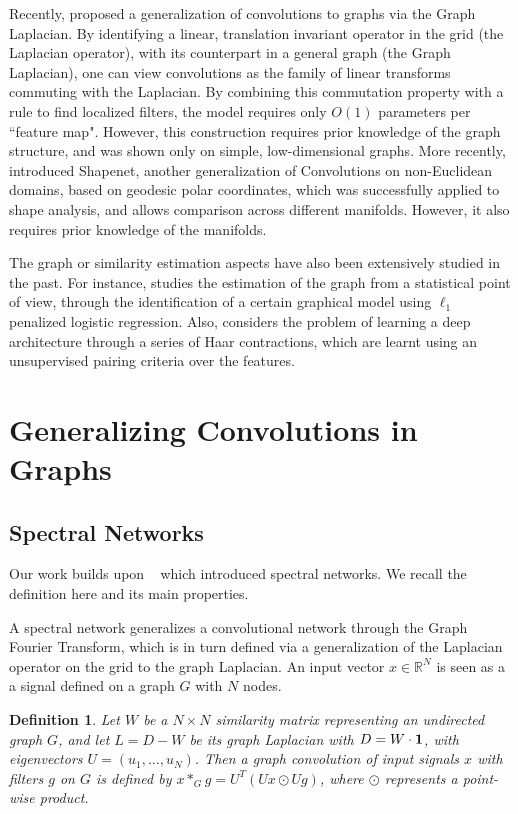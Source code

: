 \documentclass{article} %
\newtheorem{graphconv}{Definition}
\begin{document}
Recently, \cite{spectralnet2013} proposed a generalization of convolutions to graphs via the Graph Laplacian. By identifying a linear, translation invariant operator in the grid (the Laplacian operator), with its counterpart in a general graph (the Graph Laplacian), one can view convolutions as the family of linear transforms commuting with the Laplacian. By combining this commutation property with a rule to find localized filters, the model requires only $O(1)$ parameters per ``feature map". However, this construction requires prior knowledge of the graph structure, and was shown only on simple, low-dimensional graphs. More recently, \cite{DBLP:journals/corr/MasciBBV15} introduced Shapenet, another generalization of Convolutions on non-Euclidean domains, based on geodesic polar coordinates, which was successfully applied to shape analysis, and allows comparison across different manifolds. However, it also requires prior knowledge of the manifolds. 

The graph or similarity estimation aspects have also been extensively studied in the past. For instance, \cite{ravikumar2010high} studies the estimation of the graph from a statistical point of view, through the identification of a certain graphical model using $\ell_1$ penalized logistic regression. Also, \cite{chen2014unsupervised} considers the problem of learning a deep architecture through a series of Haar contractions, which are learnt using an unsupervised pairing criteria over the features.

\section{Generalizing Convolutions in Graphs }
\label{spectralsect}
\subsection{Spectral Networks}

Our work builds upon ~\cite{spectralnet2013} which introduced spectral networks. We recall the definition here and its main properties.

A spectral network generalizes a convolutional network through the Graph Fourier Transform, which is in turn defined via a generalization of the Laplacian operator on the grid to the graph Laplacian. An input vector $x \in \mathbb{R}^N$ is seen as a a signal defined on a graph $G$ with $N$ nodes. 
\begin{graphconv}
 Let $W$ be a $N \times N$ similarity matrix representing an undirected graph $G$, and let $L= D - W$ be its graph Laplacian with $D=W\cdot {\bf 1}$, with eigenvectors $U=(u_1,\dots,u_N)$. Then a \textit{graph convolution} of input signals $x$ with filters $g$ on $G$ is defined by $x \ast_G g = U^T \left( Ux \odot Ug \right)$, where $\odot$ represents a point-wise product. 
\end{graphconv}
\end{document}
